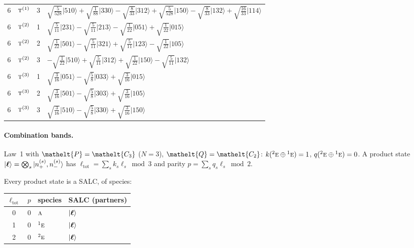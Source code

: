 \documentclass[11pt]{article}
\newcommand{\eltfont}[1]{{\let\sigma\eltsigma\mathelt{#1}}}
\newcommand{\irr}[1]{\text{\normalfont\scshape #1}}
\newcommand{\conjpair}[1]{{}^{#1}}
\newcommand{\elt}[1]{\eltfont{#1}}
\newcommand{\occ}[1]{\lvert #1\rangle}
\newcommand{\pel}{\elt{P}}             %
\newcommand{\qel}{\elt{Q}}             %
\begin{document}
\begin{longtable}{c l c p{}}
6 & $\irr{t}^{(1)}$ & 3 & $\sqrt{\tfrac{5}{528}}\occ{510}+\sqrt{\tfrac{1}{88}}\occ{330}-\sqrt{\tfrac{8}{33}}\occ{312}+\sqrt{\tfrac{5}{528}}\occ{150}-\sqrt{\tfrac{8}{33}}\occ{132}+\sqrt{\tfrac{16}{33}}\occ{114}$\\
6 & $\irr{t}^{(2)}$ & 1 & $\sqrt{\tfrac{5}{11}}\occ{231}-\sqrt{\tfrac{5}{11}}\occ{213}-\sqrt{\tfrac{1}{22}}\occ{051}+\sqrt{\tfrac{1}{22}}\occ{015}$\\
6 & $\irr{t}^{(2)}$ & 2 & $\sqrt{\tfrac{1}{22}}\occ{501}-\sqrt{\tfrac{5}{11}}\occ{321}+\sqrt{\tfrac{5}{11}}\occ{123}-\sqrt{\tfrac{1}{22}}\occ{105}$\\
6 & $\irr{t}^{(2)}$ & 3 & $-\sqrt{\tfrac{1}{22}}\occ{510}+\sqrt{\tfrac{5}{11}}\occ{312}+\sqrt{\tfrac{1}{22}}\occ{150}-\sqrt{\tfrac{5}{11}}\occ{132}$\\
6 & $\irr{t}^{(3)}$ & 1 & $\sqrt{\tfrac{3}{16}}\occ{051}-\sqrt{\tfrac{5}{8}}\occ{033}+\sqrt{\tfrac{3}{16}}\occ{015}$\\
6 & $\irr{t}^{(3)}$ & 2 & $\sqrt{\tfrac{3}{16}}\occ{501}-\sqrt{\tfrac{5}{8}}\occ{303}+\sqrt{\tfrac{3}{16}}\occ{105}$\\
6 & $\irr{t}^{(3)}$ & 3 & $\sqrt{\tfrac{3}{16}}\occ{510}-\sqrt{\tfrac{5}{8}}\occ{330}+\sqrt{\tfrac{3}{16}}\occ{150}$\\
\hline
\end{longtable}

\paragraph{Combination bands.}

Law~1 with $\pel=\elt{C_{3}}$ ($N=3$), $\qel=\elt{C_{2}}$: $k(\conjpair{2}\irr{e}\oplus \conjpair{1}\irr{e})=1$, $q(\conjpair{2}\irr{e}\oplus \conjpair{1}\irr{e})=0$. A product state $\ket{\boldsymbol\ell}=\bigotimes_s\ket{n_+^{(s)},n_-^{(s)}}$ has $\ell_{\mathrm{tot}}=\sum_sk_s\ell_s\bmod 3$ and parity $p=\sum_sq_s\ell_s\bmod2$.

Every product state is a SALC, of species:

\begin{longtable}{c c l l}\hline $\ell_{\mathrm{tot}}$ & $p$ & species & SALC (partners)\\ \hline\endhead

0 & 0 & $\irr{a}$ & $\ket{\boldsymbol\ell}$\\

1 & 0 & $\conjpair{1}\irr{e}$ & $\ket{\boldsymbol\ell}$\\

2 & 0 & $\conjpair{2}\irr{e}$ & $\ket{\boldsymbol\ell}$\\

\hline\end{longtable}
\end{document}

